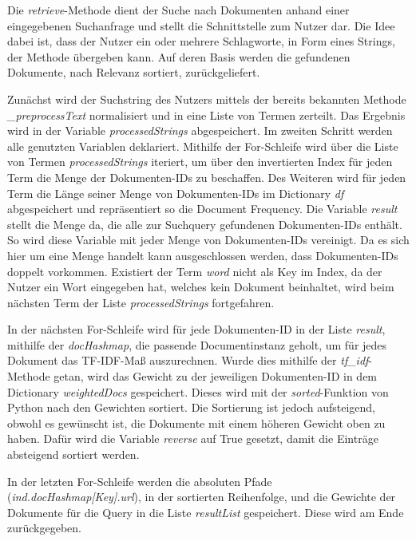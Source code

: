 Die \textit{retrieve}-Methode dient der Suche nach Dokumenten anhand einer eingegebenen Suchanfrage und stellt die Schnittstelle zum Nutzer dar. Die Idee dabei ist, dass der Nutzer ein oder mehrere Schlagworte, in Form eines Strings, der Methode übergeben kann. Auf deren Basis werden die gefundenen Dokumente, nach Relevanz sortiert, zurückgeliefert. 

Zunächst wird der Suchstring des Nutzers mittels der bereits bekannten Methode \textit{\_preprocessText} normalisiert und in eine Liste von Termen zerteilt. Das Ergebnis wird in der Variable \textit{processedStrings} abgespeichert. Im zweiten Schritt werden alle genutzten Variablen deklariert. Mithilfe der For-Schleife wird über die Liste von Termen \textit{processedStrings} iteriert, um über den invertierten Index für jeden Term die Menge der Dokumenten-IDs zu beschaffen. Des Weiteren wird für jeden Term die Länge seiner Menge von Dokumenten-IDs im Dictionary \textit{df} abgespeichert und repräsentiert so die Document Frequency. Die Variable \textit{result} stellt die Menge da, die alle zur Suchquery gefundenen Dokumenten-IDs enthält. So wird diese Variable mit jeder Menge von Dokumenten-IDs vereinigt. Da es sich hier um eine Menge handelt kann ausgeschlossen werden, dass Dokumenten-IDs doppelt vorkommen. Existiert der Term \textit{word} nicht als Key im Index, da der Nutzer ein Wort eingegeben hat, welches kein Dokument beinhaltet, wird beim nächsten Term der Liste \emph{processedStrings} fortgefahren.

In der nächsten For-Schleife wird für jede Dokumenten-ID in der Liste \textit{result}, mithilfe der \textit{docHashmap}, die passende Documentinstanz geholt, um für jedes Dokument das TF-IDF-Maß auszurechnen. Wurde dies mithilfe der \textit{tf\_idf}-Methode getan, wird das Gewicht zu der jeweiligen Dokumenten-ID in dem Dictionary \textit{weightedDocs} gespeichert. Dieses wird mit der \textit{sorted}-Funktion von Python nach den Gewichten sortiert. Die Sortierung ist jedoch aufsteigend, obwohl es gewünscht  ist, die Dokumente mit einem höheren Gewicht oben zu haben. Dafür wird die Variable \textit{reverse} auf True gesetzt, damit die Einträge absteigend sortiert werden.

In der letzten For-Schleife werden die absoluten Pfade (\textit{ind.docHashmap[Key].url}), in der sortierten Reihenfolge, und die Gewichte der Dokumente für die Query in die Liste \textit{resultList} gespeichert. Diese wird am Ende zurückgegeben.

